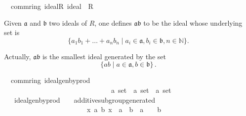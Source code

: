 \documentclass[12pt]{scrartcl}
\begin{document}
\begin{isabelle}
\isamarkupfalse%
\ {\isacharparenleft}{\kern0pt}\ comm{\isacharunderscore}{\kern0pt}ring{\isacharparenright}{\kern0pt}\ ideal{\isacharunderscore}{\kern0pt}{}{\isacharunderscore}{\kern0pt}R{\isacharcolon}{\kern0pt}\ {\isachardoublequoteopen}ideal\ {\isacharbraceleft}{\kern0pt}{\isasymzero}{\isacharbraceright}{\kern0pt}\ R\ {\isacharparenleft}{\kern0pt}{\isacharplus}{\kern0pt}{\isacharparenright}{\kern0pt}\ {\isacharparenleft}{\kern0pt}{\isasymcdot}{\isacharparenright}{\kern0pt}\ {\isasymzero}\ {\isasymone}{\isachardoublequoteclose}
\end{isabelle}

Given $\mathfrak{a}$ and $\mathfrak{b}$ two ideals of $R$, one defines $\mathfrak{a} \mathfrak{b}$ to be the ideal whose underlying set is 
\[
	\lbrace a_1 b_1 + \dots + a_n b_n \mid a_i \in \mathfrak{a}, b_i \in \mathfrak{b}, n \in \mathbb{N} \rbrace.
\]

Actually, $\mathfrak{a} \mathfrak{b}$ is the smallest ideal generated by the set 
	\[
	\lbrace a b \mid a \in \mathfrak{a}, b \in \mathfrak{b} \rbrace \, .
	\]
	

\begin{isabelle}
\isamarkupfalse%
\ {\isacharparenleft}{\kern0pt}\ comm{\isacharunderscore}{\kern0pt}ring{\isacharparenright}{\kern0pt}\ ideal{\isacharunderscore}{\kern0pt}gen{\isacharunderscore}{\kern0pt}by{\isacharunderscore}{\kern0pt}prod\ \isanewline
\ \ \ \ \ \ \ \ \ \ \ \ \ \ \ \ \ \ \ \ \ \ \ \ \ \ \ \ \ \ {\isacharcolon}{\kern0pt}{\isacharcolon}{\kern0pt}\ {\isachardoublequoteopen}{\isacharprime}{\kern0pt}a\ set\ {\isasymRightarrow}\ {\isacharprime}{\kern0pt}a\ set\ {\isasymRightarrow}\ {\isacharprime}{\kern0pt}a\ set{\isachardoublequoteclose}\isanewline
\ \ \ {\isachardoublequoteopen}ideal{\isacharunderscore}{\kern0pt}gen{\isacharunderscore}{\kern0pt}by{\isacharunderscore}{\kern0pt}prod\ {\isasymaa}\ {\isasymbb}\ {\isasymequiv}\ additive{\isachardot}{\kern0pt}subgroup{\isacharunderscore}{\kern0pt}generated\ \isanewline
\ \ \ \ \ \ \ \ \ \ \ \ \ \ \ \ \ \ \ \ \ \ \ \ {\isacharbraceleft}{\kern0pt}x{\isachardot}{\kern0pt}\ {\isasymexists}a\ b{\isachardot}{\kern0pt}\ x\ {\isacharequal}{\kern0pt}\ a\ {\isasymcdot}\ b\ {\isasymand}\ a\ {\isasymin}\ {\isasymaa}\ {\isasymand}\ b\ {\isasymin}\ {\isasymbb}{\isacharbraceright}{\kern0pt}{\isachardoublequoteclose}
\end{isabelle}
\end{document}
